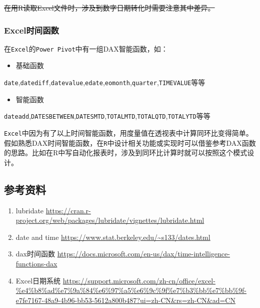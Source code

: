 \documentclass[
]{book}
\providecommand{\tightlist}{%
  \setlength{\itemsep}{0pt}\setlength{\parskip}{0pt}}
\begin{document}
\sout{在用R读取Excel文件时，涉及到数字日期转化时需要注意其中差异。}

\hypertarget{excelux65f6ux95f4ux51fdux6570}{%
\subsubsection{Excel时间函数}\label{excelux65f6ux95f4ux51fdux6570}}

在\texttt{Excel}的\texttt{Power\ Pivot}中有一组DAX智能函数，如：

\begin{itemize}
\tightlist
\item
  基础函数
\end{itemize}

\texttt{date},\texttt{datediff},\texttt{datevalue},\texttt{edate},\texttt{eomonth},\texttt{quarter},\texttt{TIMEVALUE}等等

\begin{itemize}
\tightlist
\item
  智能函数
\end{itemize}

\texttt{dateadd},\texttt{DATESBETWEEN},\texttt{DATESMTD},\texttt{TOTALMTD},\texttt{TOTALQTD},\texttt{TOTALYTD}等等

\texttt{Excel}中因为有了以上时间智能函数，用度量值在透视表中计算同环比变得简单。
假如熟悉DAX时间智能函数，在\texttt{R}中设计相关功能或实现时可以借鉴参考DAX函数的思路。比如在R中写自动化报表时，涉及到同环比计算时就可以按照这个模式设计。

\hypertarget{ux53c2ux8003ux8d44ux6599-1}{%
\subsection{参考资料}\label{ux53c2ux8003ux8d44ux6599-1}}

\begin{enumerate}
\def\labelenumi{\arabic{enumi}.}
\item
  lubridate \url{https://cran.r-project.org/web/packages/lubridate/vignettes/lubridate.html}
\item
  date and time \url{https://www.stat.berkeley.edu/~s133/dates.html}
\item
  dax时间函数 \url{https://docs.microsoft.com/en-us/dax/time-intelligence-functions-dax}
\item
  Excel日期系统 \url{https://support.microsoft.com/zh-cn/office/excel-\%e4\%b8\%ad\%e7\%9a\%84\%e6\%97\%a5\%e6\%9c\%9f\%e7\%b3\%bb\%e7\%bb\%9f-e7fe7167-48a9-4b96-bb53-5612a800b487?ui=zh-CN\&rs=zh-CN\&ad=CN}
\end{enumerate}
\end{document}
